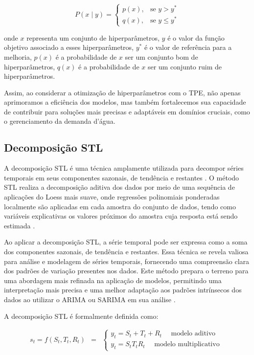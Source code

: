  \begin{equation}
 	P(x \mid y) = \begin{cases} 
 	p(x), & \text{se } y > y^* \\
 	q(x), & \text{se } y \leq y^*
 \end{cases} 
 \end{equation}
 
 \noindent onde $ x $ representa um conjunto de hiperparâmetros, $ y $ é o valor da função objetivo associado a esses hiperparâmetros, $ y^* $ é o valor de referência para a melhoria, $ p(x) $ é a probabilidade de $ x $ ser um conjunto bom de hiperparâmetros, $ q(x) $ é a probabilidade de $ x $ ser um conjunto ruim de hiperparâmetros.
 
 Assim, ao considerar a otimização de hiperparâmetros com o TPE, não apenas aprimoramos a eficiência dos modelos, mas também fortalecemos sua capacidade de contribuir para soluções mais precisas e adaptáveis em domínios cruciais, como o gerenciamento da demanda d'água.
 
 \subsection{Decomposi\c c\~ao STL}
 
 A decomposição STL é uma técnica amplamente utilizada para decompor séries temporais em seus componentes sazonais, de tendência e restantes \cite{RIBEIRO2023112982}. O método STL realiza a decomposição aditiva dos dados por meio de uma sequência de aplicações do Loess mais suave, onde regressões polinomiais ponderadas localmente são aplicadas em cada amostra do conjunto de dados, tendo como variáveis explicativas os valores próximos do amostra cuja resposta está sendo estimada \cite{Theodosiou20111178}.
 
 Ao aplicar a decomposição STL, a série temporal pode ser expressa como a soma dos componentes sazonais, de tendência e restantes. Essa técnica se revela valiosa para análise e modelagem de séries temporais, fornecendo uma compreensão clara dos padrões de variação presentes nos dados. Este método prepara o terreno para uma abordagem mais refinada na aplicação de modelos, permitindo uma interpretação mais precisa e uma melhor adaptação aos padrões intrínsecos dos dados ao utilizar o ARIMA ou SARIMA em sua análise \cite{RIBEIRO2023112982}.
 
 A decomposição STL é formalmente definida como:
 
 \begin{eqnarray}
 	s_t=f\left(S_t, T_t, R_t\right)&=&\left\{\begin{array}{l}
 		y_t=S_t+T_t+R_t \quad \text { modelo aditivo } \\
 		y_t=S_t T_t R_t \quad \text { modelo multiplicativo }
 	\end{array}\right. \label{eq:stl}
 \end{eqnarray}
 
